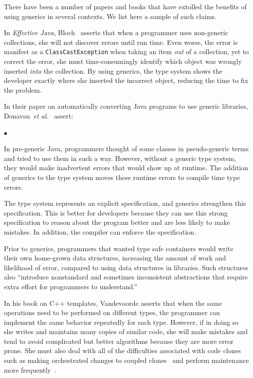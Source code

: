 \documentclass{svjour3}
\newcommand{\etal}{\emph{et al.}\xspace}
\newcommand{\code}[1]{\texttt{#1}}
\newcommand{\squishlist}{
   \begin{list}{$\bullet$}
    { \setlength{\itemsep}{0pt}      \setlength{\parsep}{3pt}
      \setlength{\topsep}{3pt}       \setlength{\partopsep}{0pt}
      \setlength{\leftmargin}{1.5em} \setlength{\labelwidth}{1em}
      \setlength{\labelsep}{0.5em} } }
\newcommand{\squishend}{
    \end{list}  }
\begin{document}
\noindent
There have been a number of papers and books that have extolled
the benefits of using generics in several contexts.
We list here a sample of such claims.

In \textit{Effective Java}, Bloch~\cite{bloch2008ej} asserts that
when a programmer uses non-generic collections, she will not discover errors 
until run time.  
Even worse, the error is manifest as a \code{ClassCastException} when taking an item
\emph{out} of a collection, yet to correct the error,
she must time-consumingly identify which object was wrongly inserted \emph{into} the collection. 
By using generics, the type system shows the developer exactly where she inserted the 
incorrect object, reducing the time to fix the problem.

In their paper on automatically converting Java programs to
use generic libraries, Donavan~\etal~\cite{donovan2004cjp} assert:

\squishlist
\item In pre-generic Java, programmers thought of some classes in pseudo-generic
terms and tried to use them in such a way.  However, without a generic
type system, they would make inadvertent errors that would show up at
runtime.  The addition of generics to the type system moves these runtime
errors to compile time type errors.

\item The type system represents an explicit specification, and 
generics strengthen this specification.
This is better for developers because they can use this strong specification to reason about
the program better and are less likely to make mistakes.  
In addition, the compiler can enforce the specification.

\item Prior to generics, programmers that wanted type safe containers would write
their own home-grown data structures, increasing the amount of work
and likelihood of error, compared to using data structures in libraries.
Such structures also ``introduce
nonstandard and sometimes inconsistent abstractions that require
extra effort for programmers to understand.''
\squishend

In his book on C++ templates, Vandevoorde \cite{vandevoorde2003c++} asserts
that when the same operations need to be performed on different types, 
the programmer can implement the same behavior repeatedly for each type.
However, if in doing so she writes and maintains many copies of similar code, she will make
mistakes and tend to avoid complicated but better algorithms because they are
more error prone.  
She must also deal with all of the difficulties
associated with code clones such as making orchestrated changes to coupled
clones~\cite{geiger2006rcc} and perform maintenance more frequently~\cite{monden2002software}.
\end{document}
